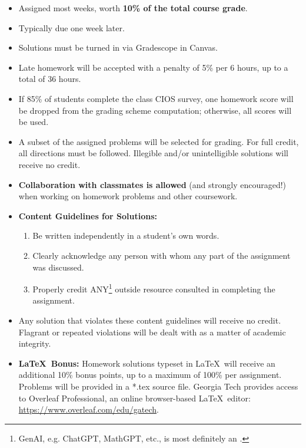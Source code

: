 \begin{itemize}
    \item Assigned most weeks, worth \textbf{10\% of the total course grade}.
    \item Typically due one week later.
    \item Solutions must be turned in via Gradescope in Canvas.
    \item Late homework will be accepted with a penalty of 5\% per 6 hours, up to a total of 36 hours.
    \item If 85\% of students complete the class CIOS survey, one homework score will be dropped from the grading scheme computation; otherwise, all scores will be used.
    \item A subset of the assigned problems will be selected for grading. For full credit, all directions must be followed. Illegible and/or unintelligible solutions will receive no credit.
    \item \textbf{Collaboration with classmates is allowed} (and strongly encouraged!) when working on homework problems and other coursework.
    \item \textbf{Content Guidelines for Solutions:}
    \begin{enumerate}
        \item Be written independently in a student's own words.
        \item Clearly acknowledge any person with whom any part of the assignment was discussed.
        \item Properly credit ANY\footnote{GenAI, e.g. ChatGPT, MathGPT, etc., is most definitely an .} outside resource consulted in completing the assignment.
    \end{enumerate}
    \item Any solution that violates these content guidelines will receive no credit. Flagrant or repeated violations will be dealt with as a matter of academic integrity.
    \item \textbf{\LaTeX\ Bonus:} Homework solutions typeset in \LaTeX\ will receive an additional 10\% bonus points, up to a maximum of 100\% per assignment. Problems will be provided in a *.tex source file. Georgia Tech provides access to Overleaf Professional, an online browser-based \LaTeX\ editor: \href{https://www.overleaf.com/edu/gatech}{https://www.overleaf.com/edu/gatech}.
\end{itemize}

